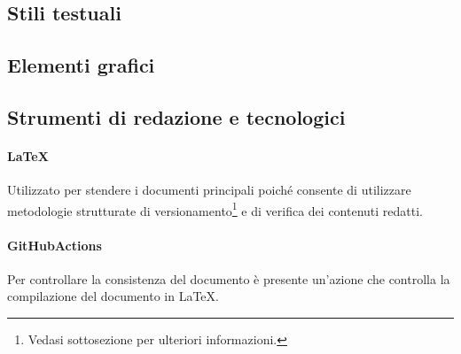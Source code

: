 \subsection{Stili testuali}
\subsection{Elementi grafici}
\subsection{Strumenti di redazione e tecnologici}

\paragraph{LaTeX} Utilizzato per stendere i documenti principali poiché consente di utilizzare metodologie strutturate di versionamento\footnote{Vedasi sottosezione  per ulteriori informazioni.} e di verifica dei contenuti redatti.

\paragraph{GitHubActions} Per controllare la consistenza del documento è presente un'azione che controlla la compilazione del documento in LaTeX.
